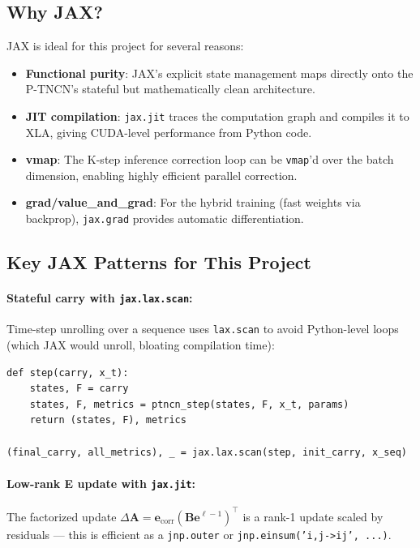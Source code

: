 \documentclass[11pt]{article}
\theoremstyle{definition}
\newcommand{\ve}{\mathbf{e}}
\newcommand{\A}{\mathbf{A}}
\newcommand{\B}{\mathbf{B}}
\begin{document}
\subsection{Why JAX?}

JAX is ideal for this project for several reasons:
\begin{itemize}
  \item \textbf{Functional purity}: JAX's explicit state management
    maps directly onto the P-TNCN's stateful but mathematically clean architecture.
  \item \textbf{JIT compilation}: \texttt{jax.jit} traces the computation graph
    and compiles it to XLA, giving CUDA-level performance from Python code.
  \item \textbf{vmap}: The K-step inference correction loop can be \texttt{vmap}'d
    over the batch dimension, enabling highly efficient parallel correction.
  \item \textbf{grad/value\_and\_grad}: For the hybrid training (fast weights via
    backprop), \texttt{jax.grad} provides automatic differentiation.
\end{itemize}

\subsection{Key JAX Patterns for This Project}

\paragraph{Stateful carry with \texttt{jax.lax.scan}:}
Time-step unrolling over a sequence uses \texttt{lax.scan} to avoid Python-level
loops (which JAX would unroll, bloating compilation time):

\begin{verbatim}
def step(carry, x_t):
    states, F = carry
    states, F, metrics = ptncn_step(states, F, x_t, params)
    return (states, F), metrics

(final_carry, all_metrics), _ = jax.lax.scan(step, init_carry, x_seq)
\end{verbatim}

\paragraph{Low-rank E update with \texttt{jax.jit}:}
The factorized update $\Delta\A = \ve_\text{corr} (\B \ve^{\ell-1})^\top$
is a rank-1 update scaled by residuals — this is efficient as a \texttt{jnp.outer}
or \texttt{jnp.einsum('i,j->ij', ...)}.
\end{document}

